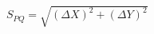 \documentclass[border=3pt]{standalone}
\begin{document}
\color{ink}\fontsize{25}{32}\selectfont
$\displaystyle S_{PQ}=\sqrt{(\Delta X)^2+(\Delta Y)^2}$
\end{document}
